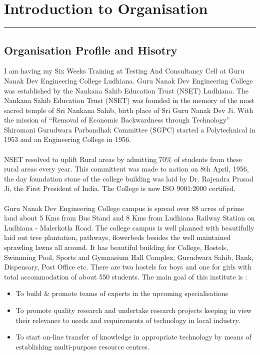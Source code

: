 \chapter{Introduction to Organisation}\hrule
\label{Chapter:1}


\section{Organisation Profile and Hisotry}
I am having my Six Weeks Training at Testing And Consultancy Cell at Guru Nanak Dev
Engineering College Ludhiana. Guru Nanak Dev Engineering College was established by the
Nankana Sahib Education Trust (NSET) Ludhiana. The Nankana Sahib Education Trust (NSET)
was founded in the memory of the most sacred temple of Sri Nankana Sahib, birth place of Sri Guru
Nanak Dev Ji. With the mission of ``Removal of Economic Backwardness through Technology''
Shiromani Gurudwara Parbandhak Committee (SGPC) started a Polytechnical in 1953 and an
Engineering College in 1956.\\
\\
NSET resolved to uplift Rural areas by admitting 70\% of students from these rural areas every year.
This committent was made to nation on 8th April, 1956, the day foundation stone of the college
building was laid by Dr. Rajendra Prasad Ji, the First President of India. The College is now ISO
9001:2000 certified.\\
\\
Guru Nanak Dev Engineering College campus is spread over 88 acres of prime land about 5 Kms
from Bus Stand and 8 Kms from Ludhiana Railway Station on Ludhiana - Malerkotla Road. The
college campus is well planned with beautifully laid out tree plantation, pathways, flowerbeds
besides the well maintained sprawling lawns all around. It has beautiful building for College,
Hostels, Swimming Pool, Sports and Gymnasium Hall Complex, Gurudwara Sahib, Bank,
Dispensary, Post Office etc. There are two hostels for boys and one for girls with total
accommodation of about 550 students. The main goal of this institute is :
\begin{itemize}
	\item To build \& promote teams of experts in the upcoming specialisations
	\item To promote quality research and undertake research projects keeping in view their
	relevance to needs and requirements of technology in local industry.
	\item To start on-line transfer of knowledge in appropriate technology by means of establishing
	multi-purpose resource centres.
\end{itemize}
